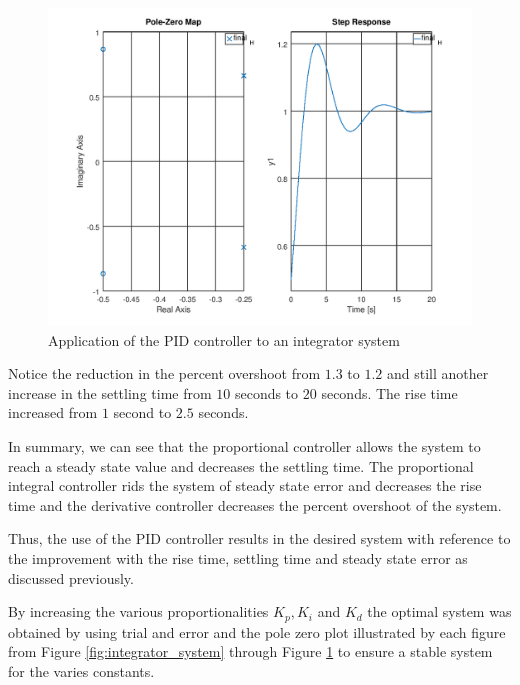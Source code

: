 \documentclass[a4paper, 12pt]{article}
\begin{document}
\begin{figure}[H]
	\centering
	\includegraphics[width=\textwidth]{integrator_system_proportional_integral_derivative_controller.png}
	\caption{Application of the PID controller to an integrator system}
	\label{fig:integrator_system_proportional_integral_derivative_controller}
\end{figure}

Notice the reduction in the percent overshoot from $1.3$ to $1.2$ and still
another increase in the settling time from $10$ seconds to $20$ seconds. The
rise time increased from $1$ second to $2.5$ seconds.

\par

In summary, we can see that the proportional controller allows the system to
reach a steady state value and decreases the settling time. The proportional
integral controller rids the system of steady state error and decreases the
rise time and the derivative controller decreases the percent overshoot of the
system.

Thus, the use of the PID controller results in the desired system with reference
to the improvement with the rise time, settling time and steady state error as
discussed previously.

By increasing the various proportionalities $K_p, K_i$ and $K_d$ the optimal
system was obtained by using trial and error and the pole zero plot illustrated
by each figure from Figure \ref{fig:integrator_system} through Figure
\ref{fig:integrator_system_proportional_integral_derivative_controller} to
ensure a stable system for the varies constants.

\end{document}
